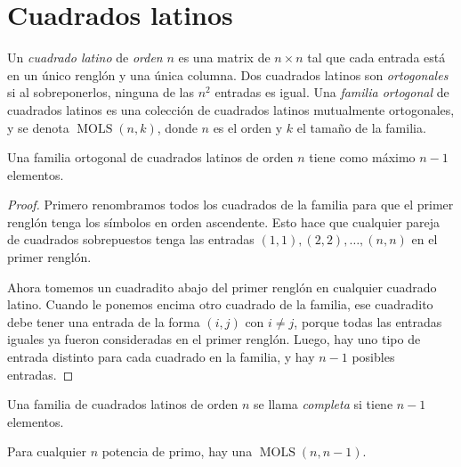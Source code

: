 \section{Cuadrados latinos}
\label{section-cuadrados-latinos}
\begin{definition}
\label{definition-combi-021}
Un \emph{cuadrado latino} de \emph{orden} $n$
es una matrix de $n\times n$ tal que cada
entrada está en un único renglón y una única
columna. Dos cuadrados latinos son
\emph{ortogonales} si al sobreponerlos,
ninguna de las $n^2$ entradas es igual. Una
\emph{familia ortogonal} de cuadrados latinos
es una colección de cuadrados latinos
mutualmente ortogonales, y se denota
$\operatorname{MOLS}(n,k)$,
donde $n$ es el orden y $k$ el tamaño
de la familia.
\end{definition}
\begin{lemma}
\label{lemma-combi-003}
Una familia ortogonal de cuadrados latinos de
orden $n$ tiene como máximo $n-1$ elementos.
\end{lemma}
\begin{proof}
Primero renombramos todos los cuadrados de la
familia para que el primer renglón tenga los
símbolos en orden ascendente. Esto hace que
cualquier pareja de cuadrados sobrepuestos
tenga las entradas $(1,1),(2,2),
\ldots,(n,n)$ en el primer renglón.

Ahora tomemos un cuadradito abajo del primer
renglón en cualquier cuadrado latino. Cuando
le ponemos encima otro cuadrado de la
familia, ese cuadradito debe tener una
entrada de la forma $(i,j)$ con $i\neq j$,
porque todas las entradas iguales ya fueron
consideradas en el primer renglón. Luego, hay
uno tipo de entrada distinto para cada
cuadrado en la familia, y hay $n-1$ posibles
entradas.
\end{proof}
\begin{definition}
\label{definition-combi-022}
Una familia de cuadrados latinos de orden $n$
se llama \emph{completa} si tiene $n-1$
elementos.
\end{definition}
\begin{theorem}
\label{theorem-combi-019}
Para cualquier $n$ potencia de primo, hay una
$ \operatorname{MOLS}(n,n-1)$.
\end{theorem}

